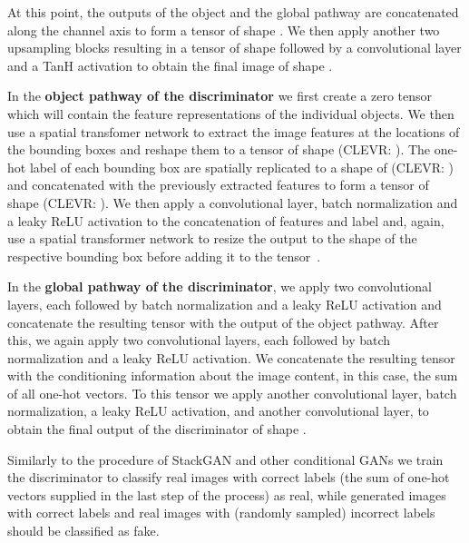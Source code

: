 \documentclass{article} \usepackage{iclr2019_conference,times}
\begin{document}
	At this point, the outputs of the object and the global pathway are concatenated along the channel axis to form a tensor of shape .
	We then apply another two upsampling blocks resulting in a tensor of shape  followed by a convolutional layer and a TanH activation to obtain the final image of shape .
	
	In the \textbf{object pathway of the discriminator} we first create a zero tensor  which will contain the feature representations of the individual objects.
	We then use a spatial transfomer network to extract the image features at the locations of the bounding boxes and reshape them to a tensor of shape  (CLEVR: ).
	The one-hot label of each bounding box are spatially replicated to a shape of  (CLEVR: ) and concatenated with the previously extracted features to form a tensor of shape  (CLEVR: ).
	We then apply a convolutional layer, batch normalization and a leaky ReLU activation to the concatenation of features and label and, again, use a spatial transformer network to resize the output to the shape of the respective bounding box before adding it to the tensor~.
	
	In the \textbf{global pathway of the discriminator}, we apply two convolutional layers, each followed by batch normalization and a leaky ReLU activation and concatenate the resulting tensor with the output of the object pathway.
	After this, we again apply two convolutional layers, each followed by batch normalization and a leaky ReLU activation.
	We concatenate the resulting tensor with the conditioning information about the image content, in this case, the sum of all one-hot vectors.
	To this tensor we apply another convolutional layer, batch normalization, a leaky ReLU activation, and another convolutional layer, to obtain the final output of the discriminator of shape .
	
	Similarly to the procedure of StackGAN and other conditional GANs we train the discriminator to classify real images with correct labels (the sum of one-hot vectors supplied in the last step of the process) as real, while generated images with correct labels and real images with (randomly sampled) incorrect labels should be classified as fake.
\end{document}
